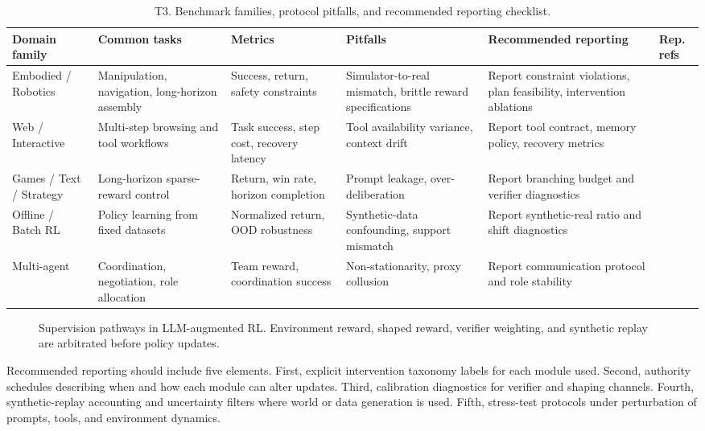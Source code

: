 \documentclass[pdflatex,sn-mathphys-num]{sn-jnl}
\begin{document}
\begin{table}[t]
\centering
\small
\setlength{\tabcolsep}{4pt}
\begin{tabularx}{\textwidth}{P{1.8cm}P{2.1cm}P{1.7cm}P{2.2cm}P{2.4cm}Y}
\toprule
\textbf{Domain family} & \textbf{Common tasks} & \textbf{Metrics} & \textbf{Pitfalls} & \textbf{Recommended reporting} & \textbf{Rep. refs}\\
\midrule
Embodied / Robotics & Manipulation, navigation, long-horizon assembly & Success, return, safety constraints & Simulator-to-real mismatch, brittle reward specifications & Report constraint violations, plan feasibility, intervention ablations & \cite{arxiv_p_2204_01691,arxiv_p_2602_02454}\\
Web / Interactive & Multi-step browsing and tool workflows & Task success, step cost, recovery latency & Tool availability variance, context drift & Report tool contract, memory policy, recovery metrics & \cite{arxiv_p_2404_03648,arxiv_p_2601_02439}\\
Games / Text / Strategy & Long-horizon sparse-reward control & Return, win rate, horizon completion & Prompt leakage, over-deliberation & Report branching budget and verifier diagnostics & \cite{arxiv_p_2305_16291,arxiv_p_2602_07848}\\
Offline / Batch RL & Policy learning from fixed datasets & Normalized return, OOD robustness & Synthetic-data confounding, support mismatch & Report synthetic-real ratio and shift diagnostics & \cite{arxiv_p_2310_20587,arxiv_p_2601_08107}\\
Multi-agent & Coordination, negotiation, role allocation & Team reward, coordination success & Non-stationarity, proxy collusion & Report communication protocol and role stability & \cite{arxiv_p_2304_07297,arxiv_p_2602_08335}\\
\bottomrule
\end{tabularx}
\caption{T3. Benchmark families, protocol pitfalls, and recommended reporting checklist.}
\label{tab:t3_eval}
\end{table}

\begin{figure}[t]
\centering
\resizebox{0.95\textwidth}{!}{}
\caption{Supervision pathways in LLM-augmented RL. Environment reward, shaped reward, verifier weighting, and synthetic replay are arbitrated before policy updates.}
\label{fig:supervision}
\end{figure}

Recommended reporting should include five elements. First, explicit intervention taxonomy labels for each module used. Second, authority schedules describing when and how each module can alter updates. Third, calibration diagnostics for verifier and shaping channels. Fourth, synthetic-replay accounting and uncertainty filters where world or data generation is used. Fifth, stress-test protocols under perturbation of prompts, tools, and environment dynamics.
\end{document}
